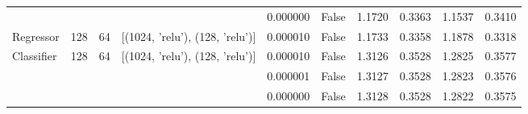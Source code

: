 \begin{table}
\begin{tabular}{llllllllll}
           &     &    &                                 & 0.000000 & False &  1.1720 &      0.3363 &   1.1537 &        0.3410 \\
Regressor & 128 & 64 & [(1024, 'relu'), (128, 'relu')] & 0.000010 & False &  1.1733 &      0.3358 &   1.1878 &        0.3318 \\
Classifier & 128 & 64 & [(1024, 'relu'), (128, 'relu')] & 0.000010 & False &  1.3126 &      0.3528 &   1.2825 &        0.3577 \\
           &     &    &                                 & 0.000001 & False &  1.3127 &      0.3528 &   1.2823 &        0.3576 \\
           &     &    &                                 & 0.000000 & False &  1.3128 &      0.3528 &   1.2822 &        0.3575 \\
\bottomrule
\end{tabular}
\end{table}
